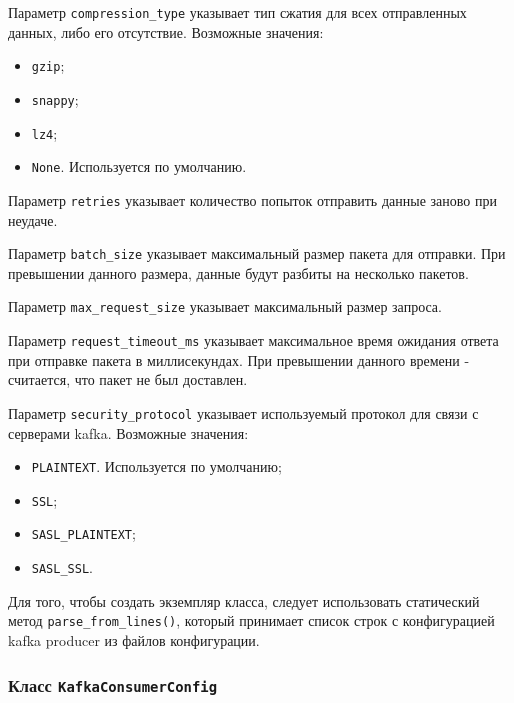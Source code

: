 Параметр \texttt{compression\_type} указывает тип сжатия для всех отправленных данных, либо его отсутствие.
Возможные значения:
\begin{itemize}
    \item \texttt{gzip};
    \item \texttt{snappy};
    \item \texttt{lz4};
    \item \texttt{None}. Используется по умолчанию.
\end{itemize}

Параметр \texttt{retries} указывает количество попыток отправить данные заново при неудаче.

Параметр \texttt{batch\_size} указывает максимальный размер пакета для отправки.
При превышении данного размера, данные будут разбиты на несколько пакетов.

Параметр \texttt{max\_request\_size} указывает максимальный размер запроса.

Параметр \texttt{request\_timeout\_ms} указывает максимальное время ожидания ответа при отправке пакета в миллисекундах.
При превышении данного времени - считается, что пакет не был доставлен.

Параметр \texttt{security\_protocol} указывает используемый протокол для связи с серверами kafka.
Возможные значения:
\begin{itemize}
    \item \texttt{PLAINTEXT}. Используется по умолчанию;
    \item \texttt{SSL};
    \item \texttt{SASL\_PLAINTEXT};
    \item \texttt{SASL\_SSL}.
\end{itemize}

Для того, чтобы создать экземпляр класса, следует использовать статический метод \texttt{parse\_from\_lines()}, который принимает список строк с конфигурацией kafka producer из файлов конфигурации.


\subsubsection{Класс \texttt{KafkaConsumerConfig}}


